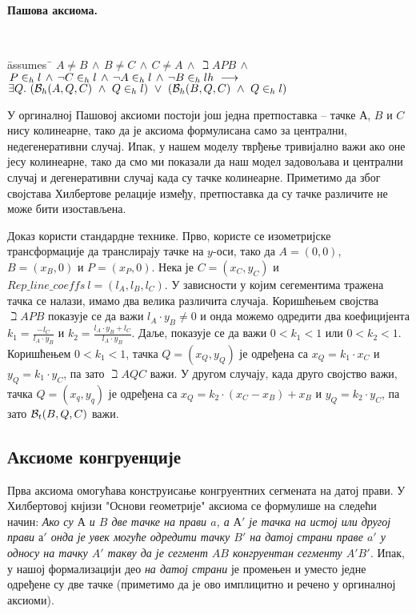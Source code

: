 \paragraph{Пашова аксиома.}

{\tt
\begin{tabbing}
\hspace{5mm}\=assumes\ \=\kill
$A \neq B\,\wedge\,B \neq C\,\wedge\,C \neq A\,\wedge\,\beth{A}{P}{B}\,\wedge$\\
$\,\inh{P}{l}\,\wedge\,\neg \inh{C}{l}\,\wedge\,\neg \inh{A}{l}\,\wedge\,\neg \inh{B}{l}h\ \longrightarrow$\\
\>$\exists Q.\ (\beth{A}{Q}{C}\  \wedge\ \inh{Q}{l})\ \vee\
               (\beth{B}{Q}{C}\  \wedge\  \inh{Q}{l})$
\end{tabbing}
}

\begin{center}

\end{center}

У оргиналној Пашовој аксиоми постоји још једна претпоставка -- тачке
$А$, $B$ и $C$ нису колинеарне, тако да је аксиома формулисана само за
централни, недегенеративни случај. Ипак, у нашем моделу тврђење
тривијално важи ако оне јесу колинеарне, тако да смо ми показали да
наш модел задовољава и централни случај и дегенеративни случај када су
тачке колинеарне. Приметимо да због својстава Хилбертове релације
између, претпоставка да су тачке различите не може бити изостављена.

Доказ користи стандардне технике. Прво, користе се изометријске
трансформације да транслирају тачке на $y$-оси, тако да $A = (0, 0)$,
$B = (x_B, 0)$ и $P = (x_P, 0)$. Нека је $C = (x_C, y_C)$ и
$\mathit{Rep\_line\_coeffs}\ l = (l_A, l_B, l_C)$. У зависности у
којим сегементима тражена тачка се налази, имамо два велика различита
случаја. Коришћењем својства $\beth{A}{P}{B}$ показује се да важи
$l_A\cdot y_B \neq 0$ и онда можемо одредити два коефицијента $k_1 =
\frac{-l_C}{l_A\cdot y_B}$ и $k_2 = \frac{l_A\cdot y_B + l_C}{l_A\cdot
  y_B}$.  Даље, показује се да важи $0 < k_1 < 1$ или $0 < k_2 <
1$. Коришћењем $0 < k_1 < 1$, тачка $Q = (x_Q, y_Q)$ је одређена са
$x_Q = k_1\cdot x_C$ и $y_Q = k_1\cdot y_C$, па зато $\beth{A}{Q}{C}$
важи. У другом случају, када друго својство важи, тачка $Q=(x_q, y_q)$
је одређена са $x_Q = k_2\cdot (x_C - x_B) + x_B$ и $y_Q = k_2\cdot
y_C$, па зато $\mathcal{B}_t(B, Q, C)$ важи.

\subsection{Аксиоме конгруенције}
Прва аксиома омогућава конструисање конгруентних сегмената на датој
прави. У Хилбертовој кнјизи "Основи геометрије" \cite{hilbert} аксиома
се формулише на следећи начин: \emph{Ако су $А$ и $B$ две тачке на
  прави $a$, а $А'$ је тачка на истој или другој прави $а'$ онда је
  увек могуће одредити тачку $B'$ на датој страни праве $a'$ у односу
  на тачку $A'$ такву да је сегмент $AB$ конгруентан сегменту $A'B'$.}
Ипак, у нашој формализацији део \emph{на датој страни} је промењен и
уместо једне одређене су две тачке (приметимо да је ово имплицитно и
речено у оргиналној аксиоми).

